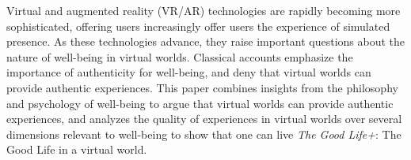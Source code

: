 Virtual and augmented reality (VR/AR) technologies are rapidly becoming more
sophisticated, offering users increasingly offer users the experience of
simulated presence. As these technologies advance, they raise important
questions about the nature of well-being in virtual worlds. Classical accounts
emphasize the importance of authenticity for well-being, and deny that virtual
worlds can provide authentic experiences. This paper combines insights from
the philosophy and psychology of well-being to argue that virtual worlds
can provide authentic experiences, and analyzes the quality of experiences in
virtual worlds over several dimensions relevant to well-being to show that one
can live \emph{The Good Life+}: The Good Life in a virtual world.
